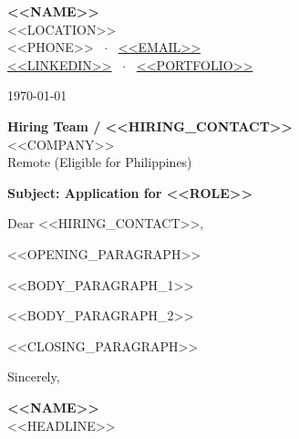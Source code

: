 \documentclass[letterpaper,11pt]{article}
\begin{document}
\textbf{<<NAME>>} \\
<<LOCATION>> \\
<<PHONE>> \ $\cdot$ \ \href{mailto:<<EMAIL>>}{<<EMAIL>>} \\
\href{<<LINKEDIN>>}{<<LINKEDIN>>} \ $\cdot$ \ \href{<<PORTFOLIO>>}{<<PORTFOLIO>>}

\vspace{12pt}
\today

\vspace{8pt}
\textbf{Hiring Team / <<HIRING_CONTACT>>} \\
<<COMPANY>> \\
Remote (Eligible for Philippines)

\vspace{8pt}
\textbf{Subject: Application for <<ROLE>>}

\vspace{4pt}
Dear <<HIRING_CONTACT>>,

<<OPENING_PARAGRAPH>>

<<BODY_PARAGRAPH_1>>

<<BODY_PARAGRAPH_2>>

<<CLOSING_PARAGRAPH>>

Sincerely,

\vspace{12pt}
\textbf{<<NAME>>} \\
<<HEADLINE>>
\end{document}
